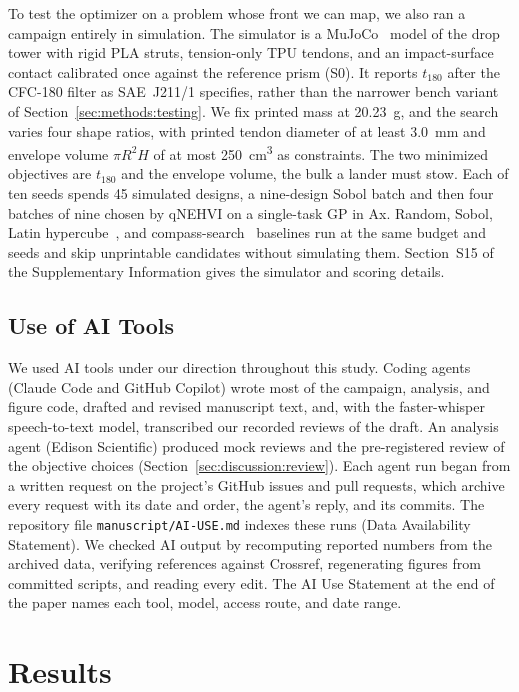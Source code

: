\documentclass[11pt]{article}
\begin{document}
To test the optimizer on a problem whose front we can map, we
also ran a campaign entirely in simulation. The simulator is a
MuJoCo~\citep{todorov2012mujoco} model of the drop tower with rigid
PLA struts, tension-only TPU tendons, and an impact-surface contact
calibrated once against the reference prism (S0). It reports $t_{180}$
after the CFC-180 filter as SAE~J211/1 specifies, rather than the
narrower bench variant of Section~\ref{sec:methods:testing}. We fix
printed mass at \SI{20.23}{g},
and the search varies four shape ratios, with printed tendon diameter
of at least \SI{3.0}{mm} and envelope volume $\pi R^2 H$ of at most
\SI{250}{cm^3} as constraints. The two minimized objectives are
$t_{180}$ and the envelope volume, the bulk a lander must stow. Each of
ten seeds spends 45 simulated designs, a nine-design Sobol batch and
then four batches of nine chosen by qNEHVI on a single-task GP in Ax.
Random, Sobol, Latin hypercube~\citep{mckay1979lhs}, and
compass-search~\citep{kolda2003directsearch} baselines run at the same
budget and seeds and skip unprintable candidates without simulating
them. Section~S15 of the Supplementary
Information gives the simulator and scoring details.

\subsection{Use of AI Tools}
\label{sec:methods:ai}

We used AI tools under our direction throughout this study. Coding
agents (Claude Code and GitHub Copilot) wrote most of the campaign,
analysis, and figure code, drafted and revised manuscript text, and,
with the faster-whisper speech-to-text model, transcribed our recorded
reviews of the draft. An analysis agent (Edison Scientific) produced
mock reviews and the pre-registered review of the objective choices
(Section~\ref{sec:discussion:review}). Each agent run began from a
written request on the project's GitHub issues and pull requests, which
archive every request with its date and order, the agent's reply, and
its commits. The repository file \texttt{manuscript/AI-USE.md} indexes
these runs (Data Availability Statement). We checked AI output by recomputing reported numbers from
the archived data, verifying references against Crossref, regenerating
figures from committed scripts, and reading every edit. The
AI Use Statement at the end of the paper names each tool, model, access route, and date range.

\section{Results}
\label{sec:results}
\end{document}
